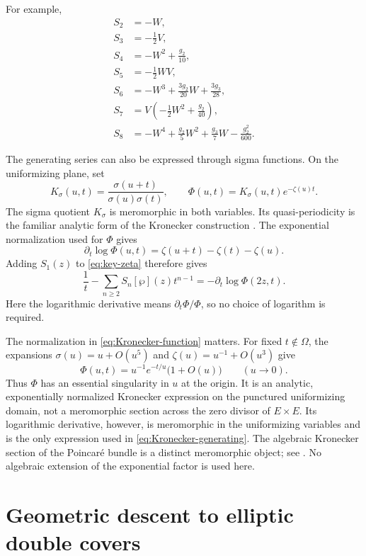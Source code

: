 \documentclass[11pt]{amsart}
\theoremstyle{definition}
\theoremstyle{remark}
\numberwithin{equation}{section}
\begin{document}
For example,
\begin{align*}
S_2&=-W,\\
S_3&=-\frac12V,\\
S_4&=-W^2+\frac{g_2}{10},\\
S_5&=-\frac12WV,\\
S_6&=-W^3+\frac{3g_2}{20}W+\frac{3g_3}{28},\\
S_7&=V\left(-\frac12W^2+\frac{g_2}{40}\right),\\
S_8&=-W^4+\frac{g_2}{5}W^2+\frac{g_3}{7}W-\frac{g_2^2}{600}.
\end{align*}


The generating series can also be expressed through sigma functions.
On the uniformizing plane, set
\begin{equation}\label{eq:Kronecker-function}
K_\sigma(u,t)=\frac{\sigma(u+t)}{\sigma(u)\sigma(t)},
\qquad
\Phi(u,t)=K_\sigma(u,t)e^{-\zeta(u)t}.
\end{equation}
The sigma quotient $K_\sigma$ is meromorphic in both variables. Its
quasi-periodicity is the familiar analytic form of the Kronecker
construction \cite{weil}. The exponential normalization used for
$\Phi$ gives
\[
\partial_t\log\Phi(u,t)
=\zeta(u+t)-\zeta(t)-\zeta(u).
\]
Adding $S_1(z)$ to \eqref{eq:key-zeta} therefore gives
\begin{equation}\label{eq:Kronecker-generating}
\frac1t-\sum_{n\geq2}S_n[\wp](z)t^{n-1}
=-\partial_t\log\Phi(2z,t).
\end{equation}
Here the logarithmic derivative means $\partial_t\Phi/\Phi$, so no
choice of logarithm is required.

The normalization in \eqref{eq:Kronecker-function} matters. For fixed
$t\notin\Omega$, the expansions $\sigma(u)=u+O(u^5)$ and
$\zeta(u)=u^{-1}+O(u^3)$ give
\[
\Phi(u,t)=u^{-1}e^{-t/u}\bigl(1+O(u)\bigr)
\qquad (u\longrightarrow0).
\]
Thus $\Phi$ has an essential singularity in $u$ at the origin. It is
an analytic, exponentially normalized Kronecker expression on the
punctured uniformizing domain, not a meromorphic section across the
zero divisor of $E\times E$. Its logarithmic derivative, however, is
meromorphic in the uniformizing variables and is the only expression
used in \eqref{eq:Kronecker-generating}. The algebraic Kronecker
section of the Poincar\'e bundle is a distinct meromorphic object;
see \cite{sprang}. No algebraic extension of the exponential factor
is used here.


\section{Geometric descent to elliptic double covers}\label{sec:double-covers}
\end{document}
